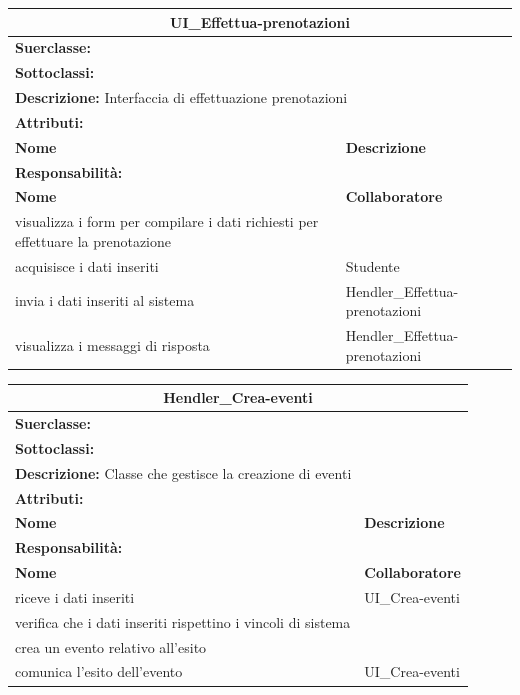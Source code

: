 \documentclass[11pt]{article}
\begin{document}
\begin{table}[H]
\centering
\begin{tabularx}{1\textwidth}{|X|X|}\hline
\multicolumn{2}{|c|}{\textbf{UI\_Effettua-prenotazioni}}\\\hline
\multicolumn{2}{|l|}{\textbf{Suerclasse:}}\\\hline
\multicolumn{2}{|l|}{\textbf{Sottoclassi:}}\\\hline
\multicolumn{2}{|l|}{\textbf{Descrizione:} Interfaccia di effettuazione prenotazioni}\\\hline
\multicolumn{2}{|l|}{\textbf{Attributi:}}\\
\textbf{Nome} & \textbf{Descrizione}\\
\hline
\multicolumn{2}{|l|}{\textbf{Responsabilità:}}\\
\textbf{Nome} & \textbf{Collaboratore}\\
visualizza i form per compilare i dati richiesti per effettuare la prenotazione & \\
acquisisce i dati inseriti & Studente\\
invia i dati inseriti al sistema & Hendler\_Effettua-prenotazioni\\
visualizza i messaggi di risposta & Hendler\_Effettua-prenotazioni\\
\hline
\end{tabularx}
\end{table}


\begin{table}[H]
\centering
\begin{tabularx}{1\textwidth}{|X|X|}\hline
\multicolumn{2}{|c|}{\textbf{Hendler\_Crea-eventi}}\\\hline
\multicolumn{2}{|l|}{\textbf{Suerclasse:}}\\\hline
\multicolumn{2}{|l|}{\textbf{Sottoclassi:}}\\\hline
\multicolumn{2}{|l|}{\textbf{Descrizione:} Classe che gestisce la creazione di eventi}\\\hline
\multicolumn{2}{|l|}{\textbf{Attributi:}}\\
\textbf{Nome} & \textbf{Descrizione}\\
\hline
\multicolumn{2}{|l|}{\textbf{Responsabilità:}}\\
\textbf{Nome} & \textbf{Collaboratore}\\
riceve i dati inseriti & UI\_Crea-eventi\\
verifica che i dati inseriti rispettino i vincoli di sistema &\\
crea un evento relativo all'esito &\\
comunica l'esito dell'evento & UI\_Crea-eventi\\
\hline
\end{tabularx}
\end{table}
\end{document}

